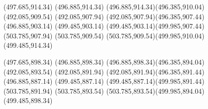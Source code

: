 {{		\moveto(497.685,914.34)
		\lineto(496.885,914.34)
		\curveto(496.885,914.34)(496.385,910.04)(492.085,909.54)
		\lineto(492.085,907.94)
		\curveto(492.085,907.94)(496.385,907.44)(496.885,903.14)
		\lineto(499.485,903.14)
		\curveto(499.485,903.14)(499.985,907.44)(503.785,907.94)
		\lineto(503.785,909.54)
		\curveto(503.785,909.54)(499.985,910.04)(499.485,914.34)
		\closepath
		
		\moveto(497.685,898.34)
		\lineto(496.885,898.34)
		\curveto(496.885,898.34)(496.385,894.04)(492.085,893.54)
		\lineto(492.085,891.94)
		\curveto(492.085,891.94)(496.385,891.44)(496.885,887.14)
		\lineto(499.485,887.14)
		\curveto(499.485,887.14)(499.985,891.44)(503.785,891.94)
		\lineto(503.785,893.54)
		\curveto(503.785,893.54)(499.985,894.04)(499.485,898.34)
		\closepath
	}
}
